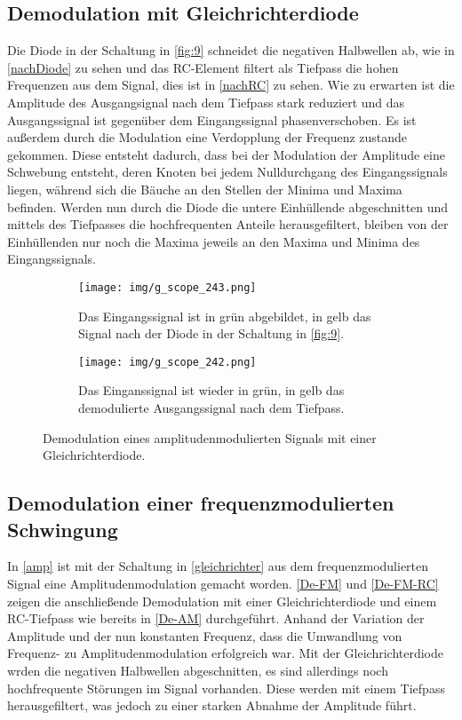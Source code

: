 \FloatBarrier

\subsection{Demodulation mit Gleichrichterdiode}
\label{De-AM}

Die Diode in der Schaltung in \autoref{fig:9} schneidet die negativen Halbwellen ab, wie in \autoref{nachDiode} zu sehen und das RC-Element filtert als Tiefpass die hohen Frequenzen aus dem Signal, dies ist in \autoref{nachRC} zu sehen. Wie zu erwarten ist die Amplitude des Ausgangsignal nach dem Tiefpass stark reduziert und das Ausgangssignal ist gegenüber dem Eingangssignal phasenverschoben. Es ist außerdem durch die Modulation eine Verdopplung der Frequenz zustande gekommen. Diese entsteht dadurch, dass bei der Modulation der Amplitude eine Schwebung entsteht, deren Knoten bei jedem Nulldurchgang des Eingangssignals liegen, während sich die Bäuche an den Stellen der Minima und Maxima befinden. Werden nun durch die Diode die untere Einhüllende abgeschnitten und mittels des Tiefpasses die hochfrequenten Anteile herausgefiltert, bleiben von der Einhüllenden nur noch die Maxima jeweils an den Maxima und Minima des Eingangssignals.

\begin{figure}[t!]
	\centering
	\begin{subfigure}[t]{0.48\textwidth}
		\centering
		\texttt{[image: img/g\_scope\_243.png]}
		\caption{Das Eingangssignal ist in grün abgebildet, in gelb das Signal nach der Diode in der Schaltung in \autoref{fig:9}.}
		\label{nachDiode}
	\end{subfigure}\hfill%
	\begin{subfigure}[t]{0.48\textwidth}
		\centering
		\texttt{[image: img/g\_scope\_242.png]}
		\caption{Das Einganssignal ist wieder in grün, in gelb das demodulierte Ausgangssignal nach dem Tiefpass.}
		\label{nachRC}
	\end{subfigure}
	\caption{Demodulation eines amplitudenmodulierten Signals mit einer Gleichrichterdiode.}
\end{figure}

\FloatBarrier

\subsection{Demodulation einer frequenzmodulierten Schwingung}

In \autoref{amp} ist mit der Schaltung in \autoref{gleichrichter} aus dem frequenzmodulierten Signal eine Amplitudenmodulation gemacht worden. \autoref{De-FM} und \autoref{De-FM-RC} zeigen die anschließende Demodulation mit einer Gleichrichterdiode und einem RC-Tiefpass wie bereits in \autoref{De-AM} durchgeführt.
Anhand der Variation der Amplitude und der nun konstanten Frequenz, dass die Umwandlung von Frequenz- zu Amplitudenmodulation erfolgreich war. Mit der Gleichrichterdiode wrden die negativen Halbwellen abgeschnitten, es sind allerdings noch hochfrequente Störungen im Signal vorhanden. Diese werden mit einem Tiefpass herausgefiltert, was jedoch zu einer starken Abnahme der Amplitude führt.

